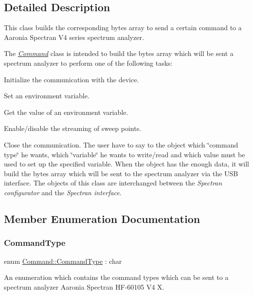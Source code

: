 \subsection{Detailed Description}
This class builds the corresponding bytes array to send a certain command to a Aaronia Spectran V4 series spectrum analyzer. 

The {\itshape \hyperlink{classCommand}{Command}} class is intended to build the bytes array which will be sent a spectrum analyzer to perform one of the following tasks\+:
\begin{DoxyItemize}
\item Initialize the communication with the device.
\item Set an environment variable.
\item Get the value of an environment variable.
\item Enable/disable the streaming of sweep points.
\item Close the communication. The user have to say to the object which \char`\"{}command type\char`\"{} he wants, which \char`\"{}variable\char`\"{} he wants to write/read and which value must be used to set up the specified variable. When the object has the enough data, it will build the bytes array which will be sent to the spectrum analyzer via the U\+SB interface. The objects of this class are interchanged between the {\itshape Spectran configurator} and the {\itshape Spectran interface}. 
\end{DoxyItemize}

\subsection{Member Enumeration Documentation}
\mbox{\label{classCommand_a658ae4be30c6dd9b673e467908acaeb5}} 
\subsubsection{\texorpdfstring{Command\+Type}{CommandType}}
{\footnotesize\ttfamily enum \hyperlink{classCommand_a658ae4be30c6dd9b673e467908acaeb5}{Command\+::\+Command\+Type} \+: char}



An enumeration which contains the command types which can be sent to a spectrum analyzer Aaronia Spectran H\+F-\/60105 V4 X. 

